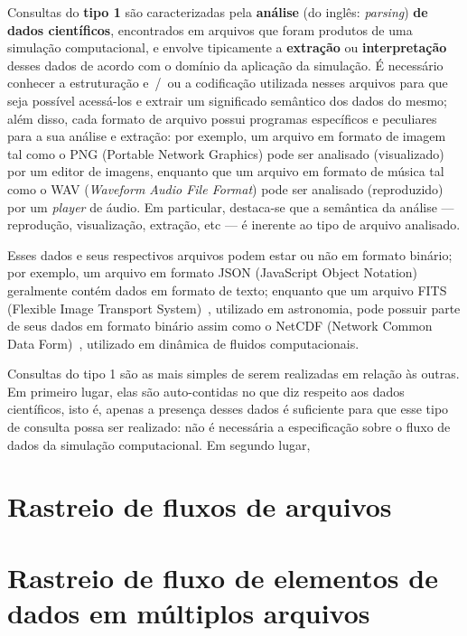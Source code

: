 Consultas do \textbf{tipo 1} são caracterizadas pela \textbf{análise} (do inglês: \textit{parsing}) \textbf{de dados científicos}, encontrados em arquivos que foram produtos de uma simulação computacional, e envolve tipicamente a \textbf{extração} ou \textbf{interpretação} desses dados de acordo com o domínio da aplicação da simulação. É necessário conhecer a estruturação e~/~ou a codificação utilizada nesses arquivos para que seja possível acessá-los e extrair um significado semântico dos dados do mesmo; além disso, cada formato de arquivo possui programas específicos e peculiares para a sua análise e extração: por exemplo, um arquivo em formato de imagem tal como o  PNG (Portable Network Graphics) pode ser analisado (visualizado) por um editor de imagens, enquanto que um arquivo em formato de música tal como o  WAV (\textit{Waveform Audio File Format}) pode ser analisado (reproduzido) por um \textit{player} de áudio. Em particular, destaca-se que a semântica da análise --- reprodução, visualização, extração, etc --- é inerente ao tipo de arquivo analisado.

Esses dados e seus respectivos arquivos podem estar ou não em formato binário; por exemplo, um arquivo em formato  JSON (JavaScript Object Notation) geralmente contém dados em formato de texto; enquanto que um arquivo FITS (Flexible Image Transport System)~\cite{greisen2002representations}, utilizado em astronomia, pode possuir parte de seus dados em formato binário assim como o NetCDF (Network Common Data Form)~\cite{rew1990netcdf}, utilizado em dinâmica de fluidos computacionais.

Consultas do tipo 1 são as mais simples de serem realizadas em relação às outras. Em primeiro lugar, elas são auto-contidas no que diz respeito aos dados científicos, isto é, apenas a presença desses dados é suficiente para que esse tipo de consulta possa ser realizado: não é necessária a especificação sobre o fluxo de dados da simulação computacional. Em segundo lugar,



\section{Rastreio de fluxos de arquivos}%
\label{sec:rastreio-de-fluxos-de-arquivos}


\section{Rastreio de fluxo de elementos de dados em múltiplos arquivos}%
\label{sec:rastreio-de-elemento-de-dados-em-multiplos-arquivos}
